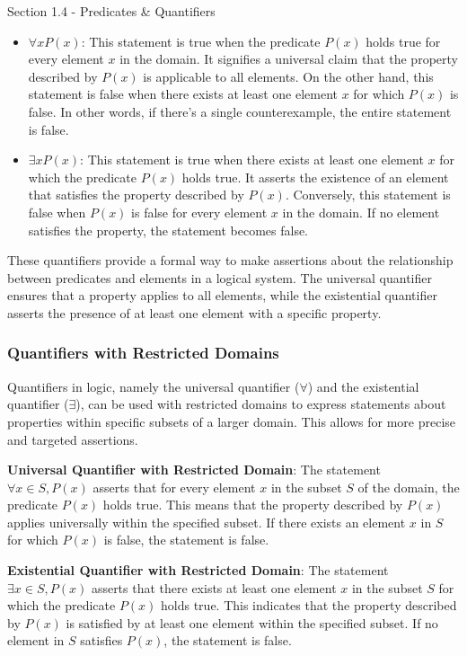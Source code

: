 \begin{notes}{Section 1.4 - Predicates \& Quantifiers}
    \begin{itemize}
        \item \textbf{\(\forall x P(x)\)}: This statement is true when the predicate \(P(x)\) holds true for every element \(x\) in the domain. It signifies a universal claim that the property described by \(P(x)\) is applicable to all elements. On the 
        other hand, this statement is false when there exists at least one element \(x\) for which \(P(x)\) is false. In other words, if there's a single counterexample, the entire statement is false.
        \item \textbf{\(\exists x P(x)\)}: This statement is true when there exists at least one element \(x\) for which the predicate \(P(x)\) holds true. It asserts the existence of an element that satisfies the property described by \(P(x)\). Conversely, 
        this statement is false when \(P(x)\) is false for every element \(x\) in the domain. If no element satisfies the property, the statement becomes false.
    \end{itemize}

    These quantifiers provide a formal way to make assertions about the relationship between predicates and elements in a logical system. The universal quantifier ensures that a property applies to all elements, while the existential quantifier asserts 
    the presence of at least one element with a specific property.
    
    \subsubsection*{Quantifiers with Restricted Domains}

    Quantifiers in logic, namely the universal quantifier (\(\forall\)) and the existential quantifier (\(\exists\)), can be used with restricted domains to express statements about properties within specific subsets of a larger domain. This allows for more 
    precise and targeted assertions.
    
    \textbf{Universal Quantifier with Restricted Domain}: The statement \(\forall x \in S, P(x)\) asserts that for every element \(x\) in the subset \(S\) of the domain, the predicate \(P(x)\) holds true. This means that the property described by \(P(x)\) 
    applies universally within the specified subset. If there exists an element \(x\) in \(S\) for which \(P(x)\) is false, the statement is false.
    
    \textbf{Existential Quantifier with Restricted Domain}: The statement \(\exists x \in S, P(x)\) asserts that there exists at least one element \(x\) in the subset \(S\) for which the predicate \(P(x)\) holds true. This indicates that the property described 
    by \(P(x)\) is satisfied by at least one element within the specified subset. If no element in \(S\) satisfies \(P(x)\), the statement is false.
    

\end{notes}
